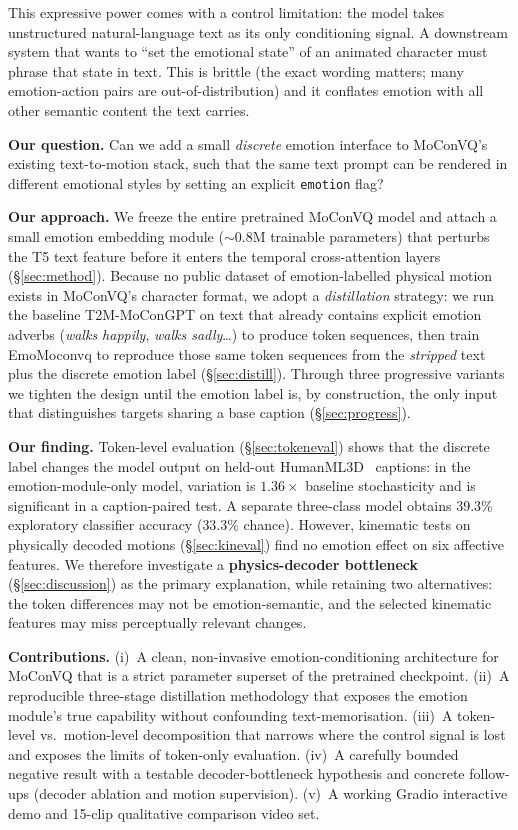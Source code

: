 \documentclass[conference]{IEEEtran}
\begin{document}
This expressive power comes with a control limitation: the model takes
unstructured natural-language text as its only conditioning signal. A
downstream system that wants to ``set the emotional state'' of an
animated character must phrase that state in text. This is brittle (the
exact wording matters; many emotion-action pairs are out-of-distribution)
and it conflates emotion with all other semantic content the text carries.

\textbf{Our question.}
Can we add a small \emph{discrete} emotion interface to MoConVQ's existing
text-to-motion stack, such that the same text prompt can be rendered in
different emotional styles by setting an explicit \texttt{emotion} flag?

\textbf{Our approach.}
We freeze the entire pretrained MoConVQ model and attach a small emotion
embedding module ($\sim 0.8$M trainable parameters) that perturbs the T5
text feature before it enters the temporal cross-attention layers
(\S\ref{sec:method}). Because no public dataset of emotion-labelled
physical motion exists in MoConVQ's character format, we adopt a
\emph{distillation} strategy: we run the baseline T2M-MoConGPT on text
that already contains explicit emotion adverbs (\textit{walks happily},
\textit{walks sadly}\ldots) to produce token sequences, then train
EmoMoconvq to reproduce those same token sequences from the \emph{stripped}
text plus the discrete emotion label (\S\ref{sec:distill}). Through three
progressive variants we tighten the design until the emotion label is, by
construction, the only input that distinguishes targets sharing a base caption
(\S\ref{sec:progress}).

\textbf{Our finding.}
Token-level evaluation (\S\ref{sec:tokeneval}) shows that the discrete label
changes the model output on held-out HumanML3D~\cite{guo2022generating}
captions: in the emotion-module-only model, variation is $1.36\!\times$
baseline stochasticity and is significant in a caption-paired test. A
separate three-class model obtains 39.3\% exploratory classifier accuracy
($33.3\%$ chance). However, kinematic tests on physically decoded motions
(\S\ref{sec:kineval}) find no emotion effect on six affective features. We
therefore investigate a \textbf{physics-decoder bottleneck}
(\S\ref{sec:discussion}) as the primary explanation, while retaining two
alternatives: the token differences may not be emotion-semantic, and the
selected kinematic features may miss perceptually relevant changes.

\textbf{Contributions.}
(i)~A clean, non-invasive emotion-conditioning architecture for MoConVQ
that is a strict parameter superset of the pretrained checkpoint.
(ii)~A reproducible three-stage distillation methodology that exposes the
emotion module's true capability without confounding text-memorisation.
(iii)~A token-level vs.\ motion-level decomposition that narrows where the
control signal is lost and exposes the limits of token-only evaluation.
(iv)~A carefully bounded negative result with a testable decoder-bottleneck
hypothesis and concrete follow-ups (decoder ablation and motion supervision).
(v)~A working Gradio interactive demo and 15-clip qualitative comparison
video set.
\end{document}
